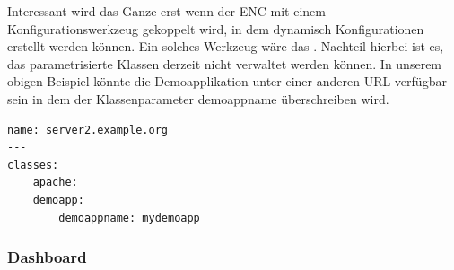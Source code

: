 \documentclass[12pt,a4paper,ngerman]{article}
\begin{document}
Interessant wird das Ganze erst wenn der ENC mit einem Konfigurationswerkzeug gekoppelt wird, in dem dynamisch Konfigurationen erstellt werden können. Ein solches Werkzeug wäre das \cite{puppetdashboard}. Nachteil hierbei ist es, das parametrisierte Klassen derzeit nicht verwaltet werden können. In unserem obigen Beispiel könnte die Demoapplikation unter einer anderen URL verfügbar sein in dem der Klassenparameter demoappname überschreiben wird.


\begin{lstlisting}[caption=ENC's YAML mit Klassenparameter , label=puppet-enc-yaml-param]
name: server2.example.org
---
classes: 
    apache:
    demoapp: 
        demoappname: mydemoapp
\end{lstlisting} 

\subsubsection{Dashboard}
\end{document}
